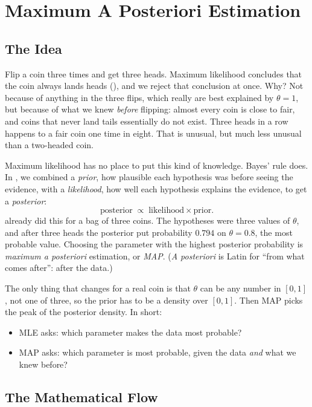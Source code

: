 \section{Maximum A Posteriori Estimation}
\label{sec:ch06-map}

\subsection{The Idea}
\label{sec:ch06-map-idea}

Flip a coin three times and get three heads. Maximum likelihood
concludes that the coin always lands heads (),
and we reject that conclusion at once. Why? Not because of anything in
the three flips, which really are best explained by $\theta = 1$, but
because of what we knew \emph{before} flipping: almost every coin is
close to fair, and coins that never land tails essentially do not
exist. Three heads in a row happens to a fair coin one time in eight.
That is unusual, but much less unusual than a two-headed coin.

Maximum likelihood has no place to put this kind of knowledge. Bayes'
rule does. In , we combined a \emph{prior}, how
plausible each hypothesis was before seeing the evidence, with a
\emph{likelihood}, how well each hypothesis explains the evidence, to
get a \emph{posterior}:
\[
  \text{posterior} \;\propto\; \text{likelihood} \times \text{prior} .
\]
 already did this for a bag of three coins. The
hypotheses were three values of $\theta$, and after three heads the
posterior put probability $0.794$ on $\theta = 0.8$, the most probable
value. Choosing the parameter with the highest posterior probability is
\emph{maximum a posteriori} estimation, or \emph{MAP}. (\emph{A
posteriori} is Latin for ``from what comes after'': after the data.)

The only thing that changes for a real coin is that $\theta$ can be any
number in $[0, 1]$, not one of three, so the prior has to be a density
over $[0, 1]$. Then MAP picks the peak of the posterior density. In
short:
\begin{itemize}
  \item MLE asks: which parameter makes the data most probable?
  \item MAP asks: which parameter is most probable, given the data
    \emph{and} what we knew before?
\end{itemize}

\subsection{The Mathematical Flow}
\label{sec:ch06-map-flow}

